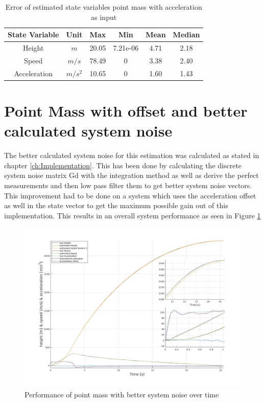 \begin{table}[h!]
\centering
\begin{tabular}{cccccc}
\hline
\multicolumn{1}{|c|}{State Variable} & \multicolumn{1}{c|}{Unit} & \multicolumn{1}{c|}{Max} & \multicolumn{1}{c|}{Min} & \multicolumn{1}{c|}{Mean} & \multicolumn{1}{c|}{Median} \\ \hline
Height                            & $m$                         & 20.05                  & 7.21e-06                 & 4.71                    & 2.18                      \\
Speed                             & $m/s$                       & 78.49                  & 0                        & 3.38                    & 2.40                      \\
Acceleration                       & $m/s^2$   			& 10.65                  & 0                        & 1.60                    & 1.43
\end{tabular}
\caption{Error of estimated state variables point mass with acceleration as input}
\label{tab:ErrorPointMassAccelerationInput}
\end{table}

\newpage
\section{Point Mass with offset and better calculated system noise}
The better calculated system noise for this estimation was calculated as stated in chapter \ref{ch:Implementation}.
This has been done by calculating the discrete system noise matrix Gd with the integration method as well as
derive the perfect measurements and then low pass filter them to get better system noise vectors.
This improvement had to be done on a system which uses the acceleration offset as well in the state vector to get the maximum possible gain out of this implementation.
This results in an overall system performance as seen in Figure \ref{fig:PointMassBetterNoisePerformance}

\begin{figure}[h!]
 \centering
 \includegraphics[width=.8 \textwidth]{./Pictures/PointMassBetterNoisePerformance.jpg}
 \caption{Performance of point mass with better system noise over time}
 \label{fig:PointMassBetterNoisePerformance}
\end{figure}

